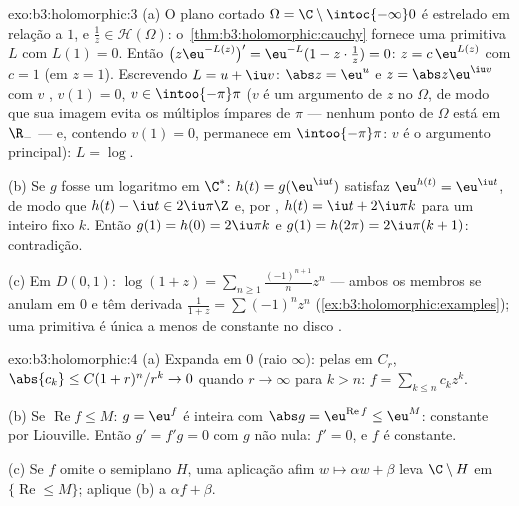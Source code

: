 \begin{solution}{exo:b3:holomorphic:3}
(a) O plano cortado $\Omega = \C\setminus\intoc{-\infty}0$ é
estrelado em relação a $1$, e $\frac1z \in \mathcal H(\Omega)$:
o~\cref{thm:b3:holomorphic:cauchy} fornece uma primitiva $L$
com $L(1) = 0$. Então $\bigl(z\eu^{-L(z)}\bigr)' =
\eu^{-L}(1 - z\cdot\frac1z) = 0$: $z = c\,\eu^{L(z)}$ com $c
= 1$ (em $z = 1$). Escrevendo $L = u + \iu v$: $\abs z = \eu^u$
e $z = \abs z\eu^{\iu v}$ com $v$ , $v(1) = 0$,
$v \in \intoo{-\pi}\pi$ ($v$ é um argumento  de $z$
no  $\Omega$, de modo que sua imagem evita os múltiplos
ímpares de $\pi$ --- nenhum ponto de $\Omega$ está em $\R_-$
--- e, contendo $v(1) = 0$, permanece em $\intoo{-\pi}\pi$:
$v$ é o argumento principal): $L = \log$.

(b) Se $g$ fosse um logaritmo  em $\C^*$: $h(t) =
g(\eu^{\iu t})$ satisfaz $\eu^{h(t)} = \eu^{\iu t}$, de modo que $h(t)
- \iu t \in 2\iu\pi\Z$ e, por , $h(t) = \iu t +
2\iu\pi k$ para um inteiro fixo $k$. Então $g(1) = h(0) =
2\iu\pi k$ e $g(1) = h(2\pi) = 2\iu\pi(k + 1)$:
contradição.

(c) Em $D(0,1)$: $\log(1 + z) =
\sum_{n\geq1}\frac{(-1)^{n+1}}{n}z^n$ --- ambos os membros se anulam em
$0$ e têm derivada $\frac1{1+z} = \sum(-1)^nz^n$
(\cref{ex:b3:holomorphic:examples}); uma primitiva é única a menos
de constante no disco .
\end{solution}

\begin{solution}{exo:b3:holomorphic:4}
(a) Expanda em $0$ (raio $\infty$): pelas 
em $C_r$, $\abs{c_k} \leq C(1 + r)^n/r^k \to 0$ quando $r \to
\infty$ para $k > n$: $f = \sum_{k\leq n}c_kz^k$.

(b) Se $\operatorname{Re}f \leq M$: $g = \eu^f$ é inteira com
$\abs g = \eu^{\operatorname{Re}f} \leq \eu^M$: constante por
Liouville. Então $g' = f'g = 0$ com $g$ não nula: $f' =
0$, e $f$ é constante.

(c) Se $f$ omite o semiplano $H$, uma aplicação afim $w \mapsto
\alpha w + \beta$ leva $\C\setminus H$ em
$\{\operatorname{Re} \leq M\}$; aplique (b) a $\alpha f +
\beta$.
\end{solution}


